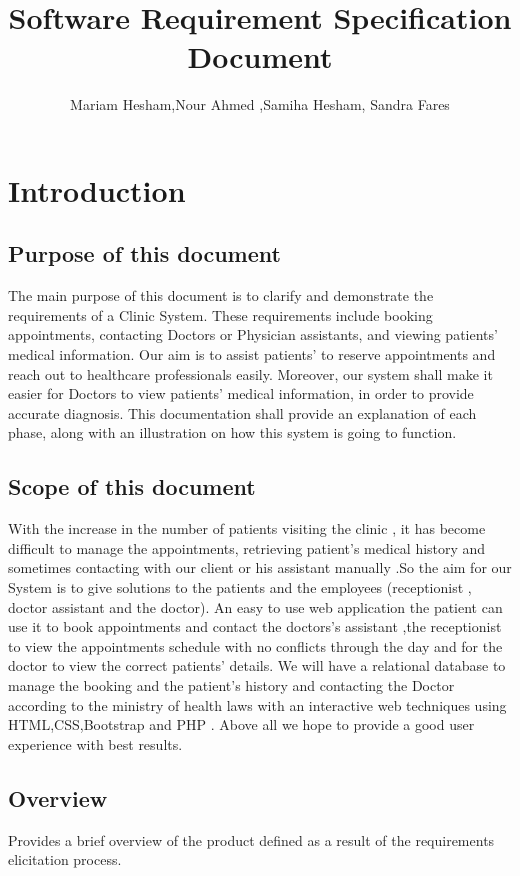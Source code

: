 \documentclass[]{article}
\title{Software Requirement Specification Document}
\author{Mariam Hesham,Nour Ahmed ,Samiha Hesham, Sandra Fares }
\begin{document}
\maketitle

\section{Introduction}

\subsection{Purpose of this document}
The main purpose of this document is to clarify and demonstrate the requirements of a Clinic System. These requirements include booking appointments, contacting Doctors or Physician assistants, and viewing patients' medical information. Our aim is to assist patients' to reserve appointments and reach out to healthcare professionals easily. Moreover, our system shall make it easier for Doctors to view patients' medical information, in order to provide accurate diagnosis. This documentation shall provide an explanation of each phase, along with an illustration on how this system is going to function. 

\subsection{ Scope of this document}
With the increase in the number of patients visiting the clinic , it has become difficult to manage the appointments, retrieving patient's medical history and sometimes contacting with our client or his assistant manually .So the aim for our System is to give solutions to the patients and the employees (receptionist , doctor assistant and the doctor). An easy to use web application the patient can use it to book appointments and contact the doctors's assistant ,the receptionist to view the appointments schedule with no conflicts through the day and for the doctor to view the correct patients' details. We will have a relational database to manage the booking and the patient's history and contacting the Doctor according to the ministry of health laws with an interactive web techniques using HTML,CSS,Bootstrap and PHP . Above all we hope to provide a good user experience with best results. 


\subsection{Overview}
Provides a brief overview of the product defined as a result of the requirements elicitation process. 
\end{document}
